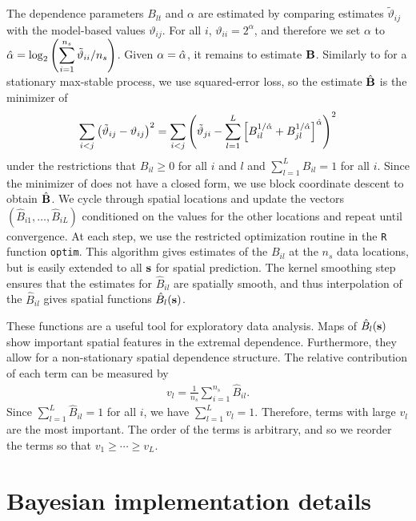 The dependence parameters $B_{lt}$ and $\alpha$ are estimated by comparing estimates ${\tilde \vartheta}_{ij}$ with the model-based values $\vartheta_{ij}$.
For all $i$, $\vartheta_{ii} = 2^{\alpha}$, and therefore we set $\alpha$ to $\hat{\alpha} = \log_2\left(\displaystyle \sum_{i=1}^{n_s}{\tilde \vartheta}_{ii}/n_s\right)$.
Given $\alpha=\hat{\alpha}$, it remains to estimate $\mathbf{B}$.
Similarly to \citet{Smith1990} for a stationary max-stable process, we use squared-error loss, so the estimate $\hat{\mathbf{B}}$ is the minimizer of
\begin{align} \label{ebeq:Bhat}
\sum_{i<j} \left({\tilde \vartheta}_{ij} - \vartheta_{ij}\right)^2
  =
  \sum_{i<j} \left({\tilde \vartheta}_{ji} - \sum_{l=1}^L \left[B_{il}^{1/\hat{\alpha}} + B_{jl}^{1/\hat{\alpha}} \right]^{\hat{\alpha}}\right)^2
\end{align}
under the restrictions that $B_{il}\ge 0$ for all $i$ and $l$ and $\displaystyle \sum_{l=1}^LB_{il}=1$ for all $i$.
Since the minimizer of  does not have a closed form, we use block coordinate descent to obtain ${\hat {\mathbf{B}}}$.
We cycle through spatial locations and update the vectors $\left(\hat{B}_{i1},\ldots,\hat{B}_{iL}\right)$ conditioned on the values for the other locations and repeat until convergence.
At each step, we use the restricted optimization routine in the \texttt{R} function \texttt{optim}.
This algorithm gives estimates of the $B_{il}$ at the $n_s$ data locations, but is easily extended to all $\mathbf{s}$ for spatial prediction.
The kernel smoothing step ensures that the estimates for $\hat{B}_{il}$ are spatially smooth, and thus interpolation of the $\hat{B}_{il}$ gives spatial functions $\hat{B}_l(\mathbf{s})$.

These functions are a useful tool for exploratory data analysis.
Maps of $\hat{B}_l(\mathbf{s})$ show important spatial features in the extremal dependence.
Furthermore, they allow for a non-stationary spatial dependence structure.
The relative contribution of each term can be measured by
\begin{align} \label{ebeq:v}
v_l = \frac{1}{n_s}\sum_{i=1}^{n_s}{\hat B}_{il}.
\end{align}
Since $\displaystyle \sum_{l=1}^L{\hat B}_{il}=1$ for all $i$, we have $\displaystyle \sum_{l=1}^Lv_l = 1$.
Therefore, terms with large $v_l$ are the most important.
The order of the terms is arbitrary, and so we reorder the terms so that $v_1\ge \cdots \ge v_L$.

\section{Bayesian implementation details}\label{ebs:MCMC}

